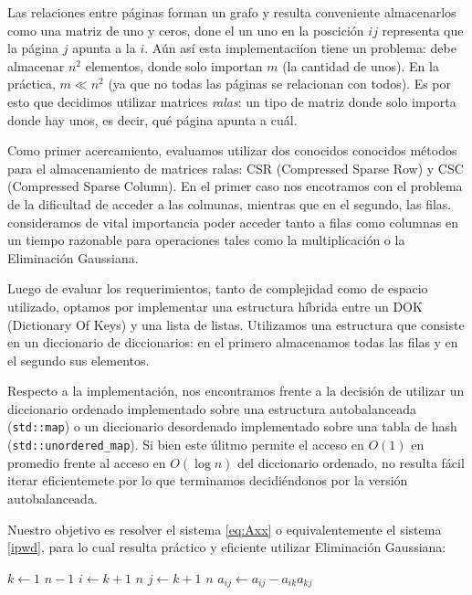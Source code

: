 
\par Las relaciones entre p\'aginas forman un grafo y resulta conveniente almacenarlos como una
matriz de uno y ceros, done el un uno en la poscici\'on $ij$ representa que la p\'agina $j$ apunta a la $i$.
A\'un as\'i esta implementaci\'ion tiene un problema: debe almacenar $n^2$ elementos, donde solo importan
$m$ (la cantidad de unos). En la pr\'actica, $m \ll n^2$ (ya que no todas las p\'aginas se relacionan
con todos). Es por esto que decidimos utilizar matrices \textit{ralas}: un tipo de matriz donde solo
importa donde hay unos, es decir, qu\'e p\'agina apunta a cu\'al.
\par Como primer acercamiento, evaluamos utilizar dos conocidos conocidos m\'etodos para el almacenamiento
de matrices ralas: CSR (Compressed Sparse Row) y CSC (Compressed Sparse Column). En el primer caso
nos encotramos con el problema de la dificultad de acceder a las colmunas, mientras que en el segundo,
las filas. consideramos de vital importancia poder acceder tanto a filas como columnas en un tiempo
razonable para operaciones tales como la multiplicación o la Eliminación Gaussiana.
\par Luego de evaluar los requerimientos, tanto de complejidad como de espacio utilizado, optamos
por implementar una estructura h\'ibrida entre un DOK (Dictionary Of Keys) y una lista de listas. 
Utilizamos una estructura que consiste en un diccionario de diccionarios: en el primero almacenamos
todas las filas y en el segundo sus elementos.
\par Respecto a la implementaci\'on, nos encontramos frente a la decisión de utilizar un diccionario ordenado
implementado sobre una estructura autobalanceada (\verb|std::map|) o un diccionario desordenado
implementado sobre una tabla de hash (\verb|std::unordered_map|). Si bien este \'ulitmo permite
el acceso en $O(1)$ en promedio frente al acceso en $O(\log n)$ del diccionario ordenado, 
no resulta f\'acil iterar eficientemete por lo que terminamos decidi\'endonos por la versi\'on autobalanceada.
\par Nuestro objetivo es resolver el sistema \ref{eq:Axx} o equivalentemente el sistema \ref{ipwd}, para lo cual 
resulta pr\'actico y eficiente utilizar Eliminación Gaussiana:

\begin{codebox}
\li \For $k \gets 1$ \To $n-1$
    \Do
\li     \For $i \gets k+1$ \To $n$
            \Do
\li         \For $j \gets k+1$ \To $n$
                \Do
\li                 $a_{ij} \gets a_{ij} - a_{ik}a_{kj}$
                \End
            \End
        \End
\end{codebox}

